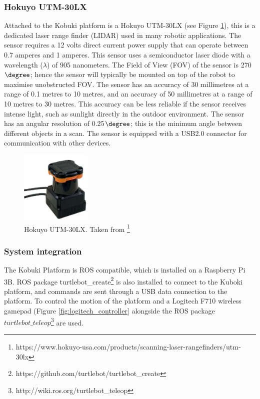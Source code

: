 \subsubsection{Hokuyo UTM-30LX}
\label{sec:hokuyo}

Attached to the Kobuki platform is a Hokuyo UTM-30LX (see Figure \ref{fig:hokuyo}), this is a dedicated laser range finder (LIDAR) used in many robotic applications. The sensor requires a 12 volts direct current power supply that can operate between 0.7 amperes and 1 amperes. This sensor uses a semiconductor laser diode with a wavelength (\(\lambda\)) of 905 nanometers. The Field of View (FOV) of the sensor is 270\(\degree\); hence the sensor will typically be mounted on top of the robot to maximise unobstructed FOV. The sensor has an accuracy of 30 millimetres at a range of 0.1 metres to 10 metres, and an accuracy of 50 millimetres at a range of 10 metres to 30 metres. This accuracy can be less reliable if the sensor receives intense light, such as sunlight directly in the outdoor environment. The sensor has an angular resolution of 0.25\(\degree\); this is the minimum angle between different objects in a scan. The sensor is equipped with a USB2.0 connector for communication with other devices.

\begin{figure}[H]
    \centering
    \includegraphics[width=0.3\textwidth]{figs/Hokuyo.png}
    \caption[Hokuyo UTM-30LX LIDAR]{Hokuyo UTM-30LX. Taken from \footnote{https://www.hokuyo-usa.com/products/scanning-laser-rangefinders/utm-30lx}}
    \label{fig:hokuyo}
\end{figure} 

\subsubsection{System integration}

The Kobuki Platform is ROS compatible, which is installed on a Raspberry Pi 3B. ROS package turtlebot\_create\footnote{https://github.com/turtlebot/turtlebot\_create} is also installed to connect to the Kuboki platform, and commands are sent through a USB data connection to the platform. To control the motion of the platform and a Logitech F710 wireless gamepad (Figure \ref{fig:logitech_controller} alongside the ROS package \(turtlebot\_teleop\)\footnote{http://wiki.ros.org/turtlebot\_teleop} are used.
 

